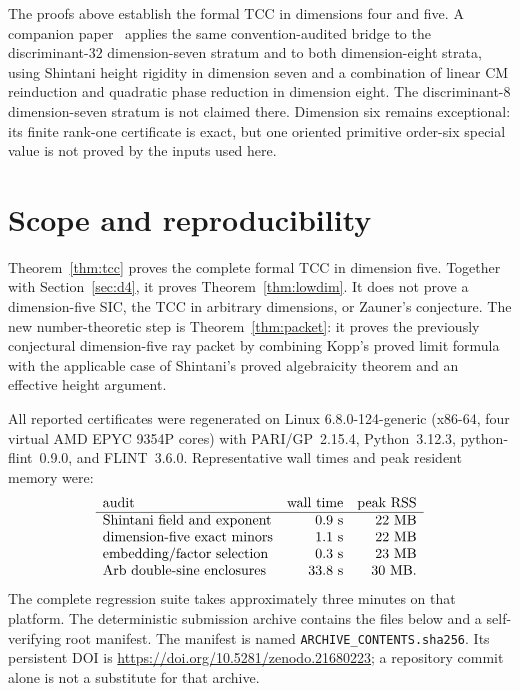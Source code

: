 \documentclass[11pt]{article}
\begin{document}
The proofs above establish the formal TCC in dimensions four and five.
A companion paper~\cite{ZhaoII} applies the same convention-audited
bridge to the discriminant-$32$ dimension-seven stratum and to both
dimension-eight strata, using Shintani height rigidity in dimension
seven and a combination of linear CM reinduction and quadratic phase
reduction in dimension eight. The discriminant-$8$ dimension-seven
stratum is not claimed there. Dimension six remains exceptional: its
finite rank-one certificate is exact, but one oriented primitive
order-six special value is not proved by the inputs used here.

\section{Scope and reproducibility}

Theorem~\ref{thm:tcc} proves the complete formal TCC in dimension five.
Together with Section~\ref{sec:d4}, it proves
Theorem~\ref{thm:lowdim}.  It does not prove a dimension-five SIC,
the TCC in arbitrary
dimensions, or Zauner's conjecture.  The new number-theoretic step is
Theorem~\ref{thm:packet}: it proves the previously conjectural
dimension-five ray packet by combining Kopp's proved limit formula with
the applicable case of Shintani's proved algebraicity theorem and an
effective height argument.

All reported certificates were regenerated on Linux
6.8.0-124-generic (x86-64, four virtual AMD EPYC 9354P cores) with
PARI/GP~2.15.4, Python~3.12.3, python-flint~0.9.0, and FLINT~3.6.0.
Representative wall times and peak resident memory were:
\[
\begin{array}{lrr}
\text{audit}&\text{wall time}&\text{peak RSS}\\ \hline
\text{Shintani field and exponent}&0.9\ {\rm s}&22\ {\rm MB}\\
\text{dimension-five exact minors}&1.1\ {\rm s}&22\ {\rm MB}\\
\text{embedding/factor selection}&0.3\ {\rm s}&23\ {\rm MB}\\
\text{Arb double-sine enclosures}&33.8\ {\rm s}&30\ {\rm MB}.
\end{array}
\]
The complete regression suite takes approximately three minutes on
that platform. The deterministic submission archive contains the files
below and a self-verifying root manifest. The manifest is named
\texttt{ARCHIVE\_CONTENTS.sha256}. Its persistent DOI is
\url{https://doi.org/10.5281/zenodo.21680223}; a repository commit
alone is not a substitute for that archive.
\end{document}
